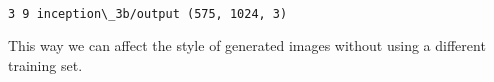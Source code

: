 \documentclass[11pt]{article}
\begin{document}
    \begin{center}
    \end{center}
    { \hspace*{\fill} \\}
    
    \begin{Verbatim}[commandchars=\\\{\}]
3 9 inception\_3b/output (575, 1024, 3)

    \end{Verbatim}

    This way we can affect the style of generated images without using a
different training set.


    
    
    
    
\end{document}

